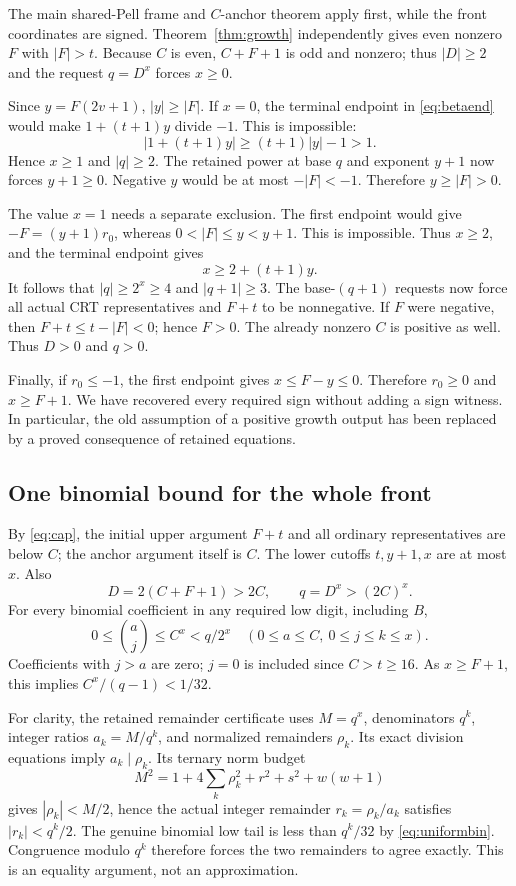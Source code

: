 \documentclass[11pt,a4paper]{article}
\theoremstyle{remark}\newtheorem{remark}[theorem]{Remark}
\begin{document}
The main shared-Pell frame and $C$-anchor theorem apply first, while the front
coordinates are signed. Theorem~\ref{thm:growth} independently gives even
nonzero $F$ with $|F|>t$. Because $C$ is even, $C+F+1$ is odd and nonzero;
thus $|D|\ge2$ and the request $q=D^x$ forces $x\ge0$.

Since $y=F(2v+1)$, $|y|\ge|F|$. If $x=0$, the terminal endpoint in
\eqref{eq:betaend} would make $1+(t+1)y$ divide $-1$. This is impossible:
\[
|1+(t+1)y|\ge(t+1)|y|-1>1.
\]
Hence $x\ge1$ and $|q|\ge2$. The retained power at base $q$ and exponent
$y+1$ now forces $y+1\ge0$. Negative $y$ would be at most $-|F|<-1$.
Therefore $y\ge|F|>0$.

The value $x=1$ needs a separate exclusion. The first endpoint would give
$-F=(y+1)r_0$, whereas $0<|F|\le y<y+1$. This is impossible. Thus
$x\ge2$, and the terminal endpoint gives
\begin{equation}\label{eq:xbound}
x\ge2+(t+1)y.
\end{equation}
It follows that $|q|\ge2^x\ge4$ and $|q+1|\ge3$. The base-$(q+1)$
requests now force all actual CRT representatives and $F+t$ to be
nonnegative. If $F$ were negative, then $F+t\le t-|F|<0$; hence $F>0$.
The already nonzero $C$ is positive as well. Thus $D>0$ and $q>0$.

Finally, if $r_0\le-1$, the first endpoint gives $x\le F-y\le0$.
Therefore $r_0\ge0$ and $x\ge F+1$. We have recovered every required sign
without adding a sign witness. In particular, the old assumption of a positive
growth output has been replaced by a proved consequence of retained equations.

\subsection{One binomial bound for the whole front}

By \eqref{eq:cap}, the initial upper argument $F+t$ and all ordinary
representatives are below $C$; the anchor argument itself is $C$.
The lower cutoffs $t,y+1,x$ are at most $x$. Also
\[
D=2(C+F+1)>2C,\qquad q=D^x>(2C)^x.
\]
For every binomial coefficient in any required low digit, including $B$,
\begin{equation}\label{eq:uniformbin}
0\le\binom{a}{j}\le C^x<q/2^x
\quad(0\le a\le C,\ 0\le j\le k\le x).
\end{equation}
Coefficients with $j>a$ are zero; $j=0$ is included since $C>t\ge16$.
As $x\ge F+1$, this implies $C^x/(q-1)<1/32$.

For clarity, the retained remainder certificate uses $M=q^x$, denominators
$q^k$, integer ratios $a_k=M/q^k$, and normalized remainders $\rho_k$.
Its exact division equations imply $a_k\mid\rho_k$. Its ternary norm budget
\[
M^2=1+4\sum_k\rho_k^2+r^2+s^2+w(w+1)
\]
gives $|\rho_k|<M/2$, hence the actual integer remainder
$r_k=\rho_k/a_k$ satisfies $|r_k|<q^k/2$. The genuine binomial low tail is
less than $q^k/32$ by \eqref{eq:uniformbin}. Congruence modulo $q^k$
therefore forces the two remainders to agree exactly. This is an equality
argument, not an approximation.
\end{document}

